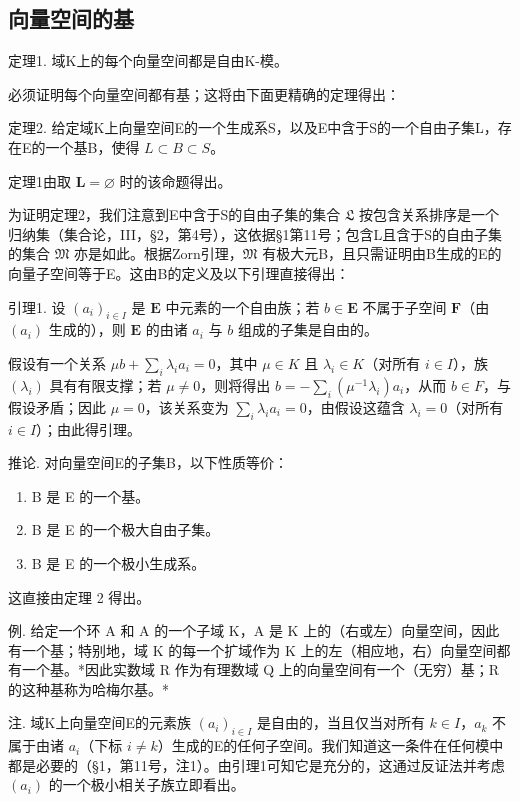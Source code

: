 \subsection{向量空间的基}

定理1. 域K上的每个向量空间都是自由K-模。

必须证明每个向量空间都有基；这将由下面更精确的定理得出：

定理2. 给定域K上向量空间E的一个生成系S，以及E中含于S的一个自由子集L，存在E的一个基B，使得 \(L \subset B \subset S\)。

定理1由取 \(\mathbf{L} = \varnothing\) 时的该命题得出。

为证明定理2，我们注意到E中含于S的自由子集的集合 \(\mathfrak{L}\) 按包含关系排序是一个归纳集（集合论，III，§2，第4号），这依据§1第11号；包含L且含于S的自由子集的集合 \(\mathfrak{M}\) 亦是如此。根据Zorn引理，\(\mathfrak{M}\) 有极大元B，且只需证明由B生成的E的向量子空间等于E。这由B的定义及以下引理直接得出：

引理1. 设 \((a_{i})_{i\in I}\) 是 \(\mathbf{E}\) 中元素的一个自由族；若 \(b\in \mathbf{E}\) 不属于子空间 \(\mathbf{F}\)（由 \((a_{i})\) 生成的），则 \(\mathbf{E}\) 的由诸 \(a_{i}\) 与 \(b\) 组成的子集是自由的。

假设有一个关系 \(\mu b + \sum_{i} \lambda_i a_i = 0\)，其中 \(\mu \in K\) 且 \(\lambda_i \in K\)（对所有 \(i \in I\)），族 \((\lambda_i)\) 具有有限支撑；若 \(\mu \neq 0\)，则将得出 \(b = -\sum_{i} (\mu^{-1} \lambda_i) a_i\)，从而 \(b \in F\)，与假设矛盾；因此 \(\mu = 0\)，该关系变为 \(\sum_{i} \lambda_i a_i = 0\)，由假设这蕴含 \(\lambda_i = 0\)（对所有 \(i \in I\)）；由此得引理。

推论. 对向量空间E的子集B，以下性质等价：

\begin{enumerate}
\def\labelenumi{(\alph{enumi})}
\item
  B 是 E 的一个基。
\item
  B 是 E 的一个极大自由子集。
\item
  B 是 E 的一个极小生成系。
\end{enumerate}

这直接由定理 2 得出。

例. 给定一个环 A 和 A 的一个子域 K，A 是 K 上的（右或左）向量空间，因此有一个基；特别地，域 K 的每一个扩域作为 K 上的左（相应地，右）向量空间都有一个基。*因此实数域 R 作为有理数域 Q 上的向量空间有一个（无穷）基；R 的这种基称为哈梅尔基。*

注. 域K上向量空间E的元素族 \((a_{i})_{i\in I}\) 是自由的，当且仅当对所有 \(k\in I\)，\(a_{k}\) 不属于由诸 \(a_{i}\)（下标 \(i\neq k\)）生成的E的任何子空间。我们知道这一条件在任何模中都是必要的（§1，第11号，注1）。由引理1可知它是充分的，这通过反证法并考虑 \((a_{i})\) 的一个极小相关子族立即看出。

